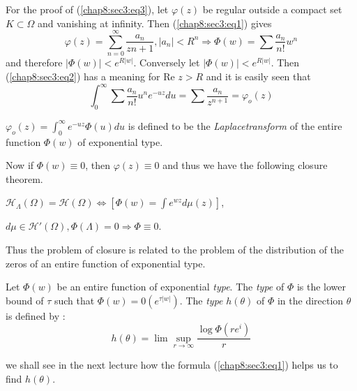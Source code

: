 For the proof of (\ref{chap8:sec3:eq3}), let $\varphi (z)$ be regular
outside a compact 
set $K \subset \Omega$ and vanishing at infinity. Then
(\ref{chap8:sec3:eq1}) gives  
$$
\varphi (z) = \sum^\infty_{n = 0} \frac{a_n}{z{n +1}}, |a_n| < R^n
\Longrightarrow \Phi (w) = \sum \frac{a_n}{n!} w^n 
$$
and therefore $|\Phi (w)| < e^{R |w|}$. Conversely let $|\Phi (w)| <
e^{R |w|}$. Then (\ref{chap8:sec3:eq2}) has a meaning for Re $z > R$
and it is easily seen that 
$$
\int^\infty_0 \sum \frac{a_n}{n !} u^n e^{-uz} du = \sum
\frac{a_n}{z^{n + 1}} = \varphi_o (z) 
$$

\begin{defi*}%
 $\varphi_o (z) = \int^\infty_0 e^{-uz} \Phi (u) du $ is defined to
 be the {\em Laplace\pageoriginale transform} of the entire function $\Phi (w)$ of
 exponential type. 
\end{defi*}

Now if $\Phi (w) \equiv 0$, then $\varphi (z) \equiv 0$ and thus we
have the following closure theorem. 

\begin{theorem*}%
 $\mathscr{H}_\Lambda (\Omega) = \mathscr{H}(\Omega)
 \Longleftrightarrow [\Phi (w) = \int e^{wz} d \mu (z)]$, 

 \noindent
 $d \mu \in \mathscr{H}' (\Omega), \Phi (\Lambda) = 0 \Longrightarrow \Phi \equiv 0$.
\end{theorem*}

Thus the problem of closure is related to the problem of the
distribution of the zeros of an entire function of exponential type. 

\begin{defi*}
 Let $\Phi (w)$ be an entire function of exponential {\em type}. The
 {\em type} of $\Phi$ is the lower bound of $\tau$ such that $\Phi
 (w) = 0 (e^{\tau | w| })$. The {\em type } $ h (\theta)$ of $\Phi$ in
 the direction $\theta$ is defined by : 
 $$
 h(\theta) = \lim \sup\limits_{r \to \infty} \frac{\log \Phi (r e^i)}{r}
 $$
\end{defi*}
we shall see in the next lecture how the formula
(\ref{chap8:sec3:eq1}) helps us to find $h(\theta)$. 

